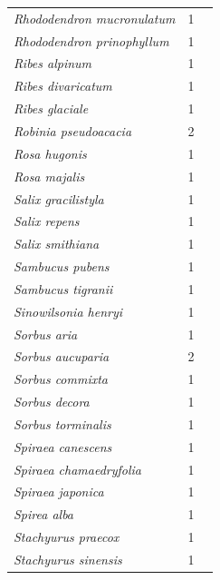 \documentclass[11pt]{article}
\begin{document}
\begin{longtable}{p{}p{}p{}}
  \emph{Rhododendron mucronulatum} &   1 & \emph{\citep{zohner2016}} \\ 
  \emph{Rhododendron prinophyllum} &   1 & \emph{\citep{flynn2018}} \\ 
  \emph{Ribes alpinum} &   1 & \emph{\citep{zohner2016}} \\ 
  \emph{Ribes divaricatum} &   1 & \emph{\citep{zohner2016}} \\ 
  \emph{Ribes glaciale} &   1 & \emph{\citep{zohner2016}} \\ 
  \emph{Robinia pseudoacacia} &   2 & \emph{\citep{Laube:2014a,Laube:2014b}} \\ 
  \emph{Rosa hugonis} &   1 & \emph{\citep{zohner2016}} \\ 
  \emph{Rosa majalis} &   1 & \emph{\citep{zohner2016}} \\ 
  \emph{Salix gracilistyla} &   1 & \emph{\citep{zohner2016}} \\ 
  \emph{Salix repens} &   1 & \emph{\citep{zohner2016}} \\ 
  \emph{Salix smithiana} &   1 & \emph{\citep{Caffarra:2011a}} \\ 
  \emph{Sambucus pubens} &   1 & \emph{\citep{zohner2016}} \\ 
  \emph{Sambucus tigranii} &   1 & \emph{\citep{zohner2016}} \\ 
  \emph{Sinowilsonia henryi} &   1 & \emph{\citep{zohner2016}} \\ 
  \emph{Sorbus aria} &   1 & \emph{\citep{zohner2016}} \\ 
  \emph{Sorbus aucuparia} &   2 & \emph{\citep{Basler:2012,Heide:1993}} \\ 
  \emph{Sorbus commixta} &   1 & \emph{\citep{zohner2016}} \\ 
  \emph{Sorbus decora} &   1 & \emph{\citep{zohner2016}} \\ 
  \emph{Sorbus torminalis} &   1 & \emph{\citep{malyshev2018}} \\ 
  \emph{Spiraea canescens} &   1 & \emph{\citep{zohner2016}} \\ 
  \emph{Spiraea chamaedryfolia} &   1 & \emph{\citep{zohner2016}} \\ 
  \emph{Spiraea japonica} &   1 & \emph{\citep{zohner2016}} \\ 
  \emph{Spirea alba} &   1 & \emph{\citep{flynn2018}} \\ 
  \emph{Stachyurus praecox} &   1 & \emph{\citep{zohner2016}} \\ 
  \emph{Stachyurus sinensis} &   1 & \emph{\citep{zohner2016}} \\ 

\end{longtable}
\end{document}
